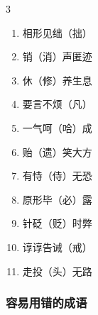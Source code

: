 \documentclass[final,oneside]{ctexbook}
\begin{document}
\begin{multicols}{3}
\begin{enumerate}
    \item 相形见绌（拙）
    \item 销（消）声匿迹
    \item 休（修）养生息
    \item 要言不烦（凡）
    \item 一气呵（哈）成
    \item 贻（遗）笑大方
    \item 有恃（侍）无恐
    \item 原形毕（必）露
    \item 针砭（贬）时弊
    \item 谆谆告诫（戒）
    \item 走投（头）无路
  \end{enumerate}
\end{multicols}

\subsubsection{容易用错的成语}
\end{document}
